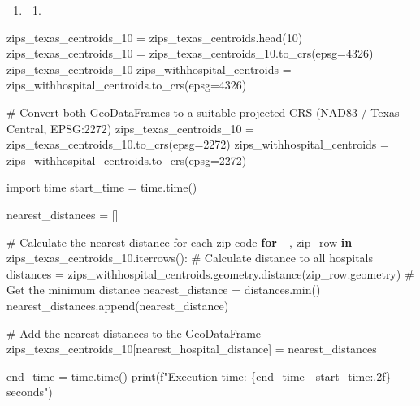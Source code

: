 \documentclass[
  letterpaper,
  DIV=11,
  numbers=noendperiod]{scrartcl}
\newenvironment{Shaded}{\begin{snugshade}}{\end{snugshade}}
\newcommand{\BuiltInTok}[1]{\textcolor[rgb]{0.00,0.23,0.31}{#1}}
\newcommand{\CommentTok}[1]{\textcolor[rgb]{0.37,0.37,0.37}{#1}}
\newcommand{\ControlFlowTok}[1]{\textcolor[rgb]{0.00,0.23,0.31}{\textbf{#1}}}
\newcommand{\DecValTok}[1]{\textcolor[rgb]{0.68,0.00,0.00}{#1}}
\newcommand{\ImportTok}[1]{\textcolor[rgb]{0.00,0.46,0.62}{#1}}
\newcommand{\KeywordTok}[1]{\textcolor[rgb]{0.00,0.23,0.31}{\textbf{#1}}}
\newcommand{\NormalTok}[1]{\textcolor[rgb]{0.00,0.23,0.31}{#1}}
\newcommand{\OperatorTok}[1]{\textcolor[rgb]{0.37,0.37,0.37}{#1}}
\newcommand{\SpecialCharTok}[1]{\textcolor[rgb]{0.37,0.37,0.37}{#1}}
\newcommand{\SpecialStringTok}[1]{\textcolor[rgb]{0.13,0.47,0.30}{#1}}
\newcommand{\StringTok}[1]{\textcolor[rgb]{0.13,0.47,0.30}{#1}}
\providecommand{\tightlist}{%
  \setlength{\itemsep}{0pt}\setlength{\parskip}{0pt}}\usepackage{longtable,booktabs,array}
\begin{document}
\begin{enumerate}
\def\labelenumi{\arabic{enumi}.}
\setcounter{enumi}{3}
\tightlist
\item
  \begin{enumerate}
  \def\labelenumii{\alph{enumii}.}
  \tightlist
  \item
  \end{enumerate}
\end{enumerate}

\begin{Shaded}
\begin{Highlighting}[]
\NormalTok{zips\_texas\_centroids\_10 }\OperatorTok{=}\NormalTok{ zips\_texas\_centroids.head(}\DecValTok{10}\NormalTok{)}
\NormalTok{zips\_texas\_centroids\_10 }\OperatorTok{=}\NormalTok{ zips\_texas\_centroids\_10.to\_crs(epsg}\OperatorTok{=}\DecValTok{4326}\NormalTok{)}
\NormalTok{zips\_texas\_centroids\_10}
\NormalTok{zips\_withhospital\_centroids }\OperatorTok{=}\NormalTok{ zips\_withhospital\_centroids.to\_crs(epsg}\OperatorTok{=}\DecValTok{4326}\NormalTok{)}
\end{Highlighting}
\end{Shaded}

\begin{Shaded}
\begin{Highlighting}[]
\CommentTok{\# Convert both GeoDataFrames to a suitable projected CRS (NAD83 / Texas Central, EPSG:2272)}
\NormalTok{zips\_texas\_centroids\_10 }\OperatorTok{=}\NormalTok{ zips\_texas\_centroids\_10.to\_crs(epsg}\OperatorTok{=}\DecValTok{2272}\NormalTok{)  }
\NormalTok{zips\_withhospital\_centroids }\OperatorTok{=}\NormalTok{ zips\_withhospital\_centroids.to\_crs(epsg}\OperatorTok{=}\DecValTok{2272}\NormalTok{)}

\ImportTok{import}\NormalTok{ time}
\NormalTok{start\_time }\OperatorTok{=}\NormalTok{ time.time()}

\NormalTok{nearest\_distances }\OperatorTok{=}\NormalTok{ []}

\CommentTok{\# Calculate the nearest distance for each zip code}
\ControlFlowTok{for}\NormalTok{ \_, zip\_row }\KeywordTok{in}\NormalTok{ zips\_texas\_centroids\_10.iterrows():}
    \CommentTok{\# Calculate distance to all hospitals}
\NormalTok{    distances }\OperatorTok{=}\NormalTok{ zips\_withhospital\_centroids.geometry.distance(zip\_row.geometry)}
    \CommentTok{\# Get the minimum distance}
\NormalTok{    nearest\_distance }\OperatorTok{=}\NormalTok{ distances.}\BuiltInTok{min}\NormalTok{()}
\NormalTok{    nearest\_distances.append(nearest\_distance)}

\CommentTok{\# Add the nearest distances to the GeoDataFrame}
\NormalTok{zips\_texas\_centroids\_10[}\StringTok{\textquotesingle{}nearest\_hospital\_distance\textquotesingle{}}\NormalTok{] }\OperatorTok{=}\NormalTok{ nearest\_distances}

\NormalTok{end\_time }\OperatorTok{=}\NormalTok{ time.time()}
\BuiltInTok{print}\NormalTok{(}\SpecialStringTok{f"Execution time: }\SpecialCharTok{\{}\NormalTok{end\_time }\OperatorTok{{-}}\NormalTok{ start\_time}\SpecialCharTok{:.2f\}}\SpecialStringTok{ seconds"}\NormalTok{)}
\end{Highlighting}
\end{Shaded}
\end{document}
